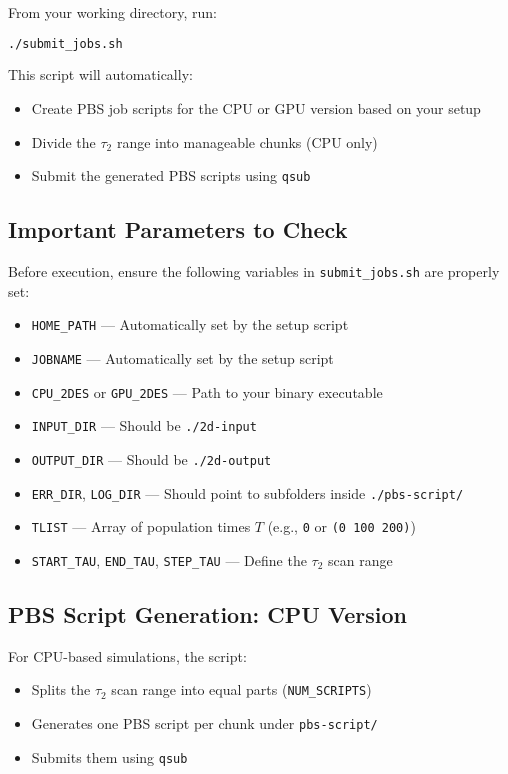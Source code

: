 \documentclass{article}
\begin{document}
From your working directory, run:

\begin{lstlisting}[language=bash]
./submit_jobs.sh
\end{lstlisting}

This script will automatically:
\begin{itemize}
    \item Create PBS job scripts for the CPU or GPU version based on your setup
    \item Divide the \(\tau_2\) range into manageable chunks (CPU only)
    \item Submit the generated PBS scripts using \texttt{qsub}
\end{itemize}

\subsection*{Important Parameters to Check}

Before execution, ensure the following variables in \texttt{submit\_jobs.sh} are properly set:

\begin{itemize}
    \item \texttt{HOME\_PATH} — Automatically set by the setup script
    \item \texttt{JOBNAME} — Automatically set by the setup script
    \item \texttt{CPU\_2DES} or \texttt{GPU\_2DES} — Path to your binary executable
    \item \texttt{INPUT\_DIR} — Should be \texttt{./2d-input}
    \item \texttt{OUTPUT\_DIR} — Should be \texttt{./2d-output}
    \item \texttt{ERR\_DIR}, \texttt{LOG\_DIR} — Should point to subfolders inside \texttt{./pbs-script/}
    \item \texttt{TLIST} — Array of population times \(T\) (e.g., \texttt{0} or \texttt{(0 100 200)})
    \item \texttt{START\_TAU}, \texttt{END\_TAU}, \texttt{STEP\_TAU} — Define the \(\tau_2\) scan range
\end{itemize}

\subsection*{PBS Script Generation: CPU Version}

For CPU-based simulations, the script:
\begin{itemize}
    \item Splits the \(\tau_2\) scan range into equal parts (\texttt{NUM\_SCRIPTS})
    \item Generates one PBS script per chunk under \texttt{pbs-script/}
    \item Submits them using \texttt{qsub}
\end{itemize}
\end{document}
